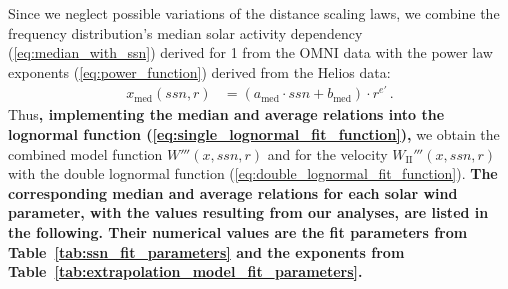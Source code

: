 Since we neglect possible variations of the distance scaling laws, we combine the frequency distribution’s median solar activity dependency (\ref{eq:median_with_ssn}) derived for \SI{1}{\au} from the OMNI data with the power law exponents (\ref{eq:power_function}) derived from the Helios data:
\begin{align}
	x_\text{med}(ssn,r) &= (a_\text{med} \cdot ssn + b_\text{med}) \cdot r^{e'}	\,.	\label{eq:general_sw_model}
\end{align}
Thus\textbf{, implementing the median and average relations into the lognormal function (\ref{eq:single_lognormal_fit_function}),} we obtain the combined model function $W'''(x,ssn,r)$ and for the velocity $W_\text{II}'''(x,ssn,r)$ with the double lognormal function (\ref{eq:double_lognormal_fit_function}). \textbf{The corresponding median and average relations for each solar wind parameter, with the values resulting from our analyses, are listed in the following. Their numerical values are the fit parameters from Table~\ref{tab:ssn_fit_parameters} and the exponents from Table~\ref{tab:extrapolation_model_fit_parameters}.}

